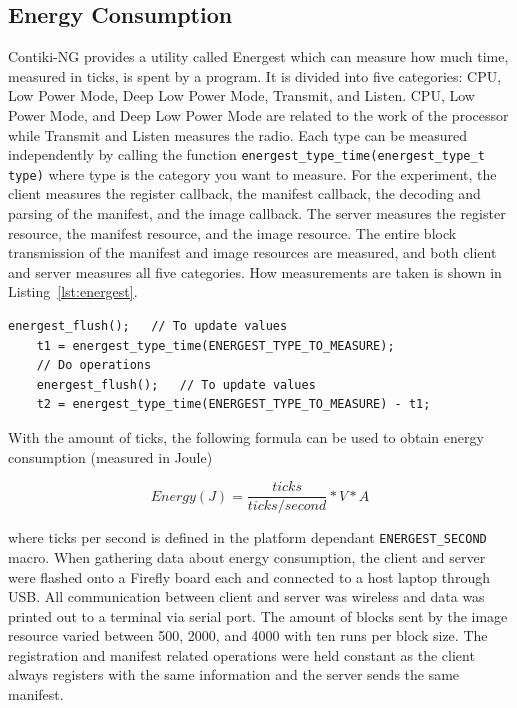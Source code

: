 \documentclass[0-thesis.tex]{subfiles}
\begin{document}
\subsection{Energy Consumption}
\label{ssec:energy-consumption}
Contiki-NG provides a utility called Energest which can measure how much time, measured in
ticks, is spent by a program. It is divided into five categories: CPU, Low Power Mode,
Deep Low Power Mode, Transmit, and Listen. CPU, Low Power Mode, and Deep Low Power Mode
are related to the work of the processor while Transmit and Listen measures the radio.
Each type can be measured independently by calling the function
\texttt{energest\_type\_time(energest\_type\_t type)} where type is the category you want
to measure. For the experiment, the client measures the register callback, the manifest
callback, the decoding and parsing of the manifest, and the image callback. The server
measures the register resource, the manifest resource, and the image resource. The entire
block transmission of the manifest and image resources are measured, and both client and
server measures all five categories. How measurements are taken is shown in
Listing~\ref{lst:energest}.

\begin{lstlisting}[language=manifest, caption={How to measure ticks in energest.}, label=lst:energest]
    energest_flush();   // To update values
    t1 = energest_type_time(ENERGEST_TYPE_TO_MEASURE);
    // Do operations
    energest_flush();   // To update values
    t2 = energest_type_time(ENERGEST_TYPE_TO_MEASURE) - t1;
\end{lstlisting}

With the amount of ticks, the following formula can be used to obtain energy consumption
(measured in Joule)

$$ Energy (J) = \frac{ticks}{ticks/second} * V * A $$

where ticks per second is defined in the platform dependant \texttt{ENERGEST\_SECOND}
macro. When gathering data about energy consumption, the client and server were flashed
onto a Firefly board each and connected to a host laptop through USB. All communication
between client and server was wireless and data was printed out to a terminal via serial
port. The amount of blocks sent by the image resource varied between 500, 2000, and 4000
with ten runs per block size. The registration and manifest related operations were held
constant as the client always registers with the same information and the server sends the
same manifest. 
\end{document}
